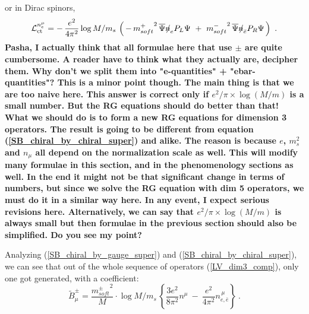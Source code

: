 \documentclass[paper,12pt]{revtex4}
\newcommand{\slashed}[1]{\hbox{{$#1$}\llap{$/$}}}
\begin{document}
	or in Dirac spinors,
\begin{equation}
\label{SB_chiral_by_chiral}
	\mathcal{L}_{\rm ct}^{n_e^\mu} = 
	-\, \frac{e^2}
		 {4\pi^2} \log M/m_s\,
	\left(\,
		-\, {m_{soft}^+}^2\, 
		\overline{\Psi} \slashed{n}_e P_L \Psi
		~+~
		{m_{soft}^-}^2\,
		\overline{\Psi} \slashed{n}_{\bar{e}} P_R \Psi
		\,
	\right)~.
\end{equation}
{\bf Pasha, I actually think that all formulae here that  use $\pm$ are quite 
cumbersome. A reader have to think what they actually are, decipher them. 
Why don't we split them into "e-quantities" + "ebar-quantities"? This is a minor point though.
The main thing is that we are too naive here. This answer is correct only if 
$e^2/\pi \times \log (M/m)$ is a small number.  But the RG equations should do better than that!
What we should do is to form a new RG equations 
for dimension 3 operators. The result is going to be different from equation 
(\ref{SB_chiral_by_chiral_super}) and alike. The reason is because $e$, $m_s^2$ and $n_\mu$ 
all depend on the normalization scale as well. This will modify many formulae in 
this section, and in the phenomenology sections as well. In the end it might not be that significant 
change in terms of numbers, but since we solve the RG equation with dim 5 operators, we must
do it in a similar way here. In any event, I expect serious revisions here. 
Alternatively, we can say that $e^2/\pi \times \log (M/m)$ is always small but then 
formulae in the previous section should also be simplified. Do you see my point?}

        Analyzing (\ref{SB_chiral_by_gauge_super}) 
	and (\ref{SB_chiral_by_chiral_super}),
	we can see that out of the whole sequence of operators
	(\ref{LV_dim3_comp}), only one got generated, with a 
	coefficient:
\begin{equation}
\label{B_mu_coef}
	\widetilde{B}^\pm_\mu = 
	\frac{{m_{soft}^\pm}^2}{M} \cdot \log M/m_s\,
	\left \{ 
		\frac{3e^2}
		     {8\pi^2} n^\mu 
		~-~
		\frac{e^2}
		     {4\pi^2} n_{e,\bar{e}}^{\,\mu}
	\right \}~.
\end{equation}
\end{document}
